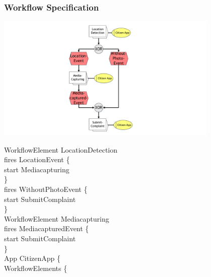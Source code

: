 
\begin{frame}
	\frametitle{Workflow Specification}
	
	\begin{minipage}{0.4\textwidth}
	    		        \includegraphics[height = 60mm, trim = 10cm 0cm 10cm 0cm, clip = true]{images/WorkflowSpecification.pdf}	  
	\end{minipage}%
	\begin{minipage}{0.6\textwidth}
					WorkflowElement LocationDetection\\
					fires LocationEvent \{\\
									start Mediacapturing\\
								\}\\
								fires WithoutPhotoEvent \{\\
									start SubmitComplaint\\
								\}\\
									
							WorkflowElement Mediacapturing\\
								fires MediacapturedEvent \{\\
									start SubmitComplaint\\
								\}\\					
							
							App CitizenApp \{\\
								WorkflowElements \{\\
	\end{minipage}

\end{frame}

